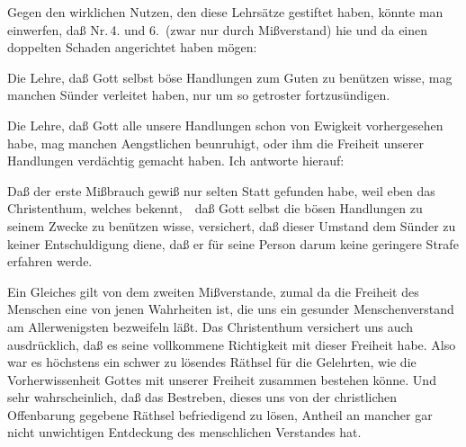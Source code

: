Gegen den wirklichen Nutzen, den diese Lehrsätze gestiftet haben, könnte man einwerfen, daß Nr.\,4. und 6.\ (zwar nur durch Mißverstand) hie und da einen doppelten Schaden angerichtet haben mögen:
\begin{aufzb}
\item Die Lehre, daß Gott selbst böse Handlungen zum Guten zu benützen wisse, mag manchen Sünder verleitet haben, nur um so getroster fortzusündigen.
\item Die Lehre, daß Gott alle unsere Handlungen schon von Ewigkeit vorhergesehen habe, mag manchen Aengstlichen beunruhigt, oder ihm die Freiheit unserer Handlungen verdächtig gemacht haben. Ich antworte hierauf:
\item Daß der erste Mißbrauch gewiß nur selten Statt gefunden habe, weil eben das Christenthum, welches bekennt,~\ daß Gott selbst die bösen Handlungen zu seinem Zwecke zu benützen wisse, versichert, daß dieser Umstand dem Sünder zu keiner Entschuldigung diene, daß er für seine Person darum keine geringere Strafe erfahren werde.
\item Ein Gleiches gilt von dem zweiten Mißverstande, zumal da die Freiheit des Menschen eine von jenen Wahrheiten ist, die uns ein gesunder Menschenverstand am Allerwenigsten bezweifeln läßt. Das Christenthum versichert uns auch ausdrücklich, daß es seine vollkommene Richtigkeit mit dieser Freiheit habe. Also war es höchstens ein schwer zu lösendes Räthsel für die Gelehrten, wie die Vorherwissenheit Gottes mit unserer Freiheit zusammen bestehen könne. Und sehr wahrscheinlich, daß das Bestreben, dieses uns von der christlichen Offenbarung gegebene Räthsel befriedigend zu lösen, Antheil an mancher gar nicht unwichtigen Entdeckung des menschlichen Verstandes hat.
\end{aufzb}

